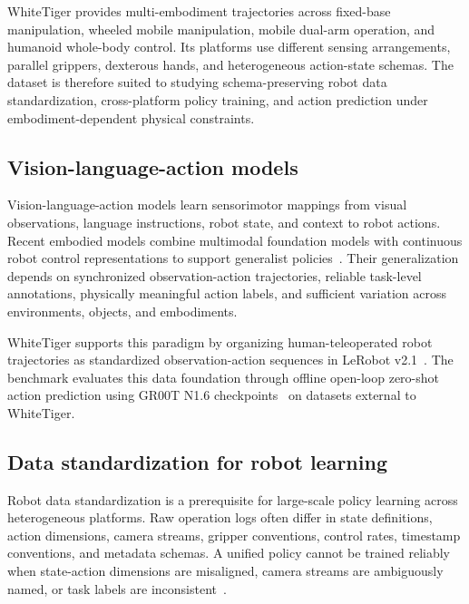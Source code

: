 WhiteTiger provides multi-embodiment trajectories across fixed-base manipulation, wheeled mobile manipulation, mobile dual-arm operation, and humanoid whole-body control. Its platforms use different sensing arrangements, parallel grippers, dexterous hands, and heterogeneous action-state schemas. The dataset is therefore suited to studying schema-preserving robot data standardization, cross-platform policy training, and action prediction under embodiment-dependent physical constraints.

\subsection{Vision-language-action models}

Vision-language-action models learn sensorimotor mappings from visual observations, language instructions, robot state, and context to robot actions. Recent embodied models combine multimodal foundation models with continuous robot control representations to support generalist policies~\cite{driess2023palme,brohan2023rt2,ghosh2024octo,kim2024openvla,black2024pi0,nvidia2025grootn1}. Their generalization depends on synchronized observation-action trajectories, reliable task-level annotations, physically meaningful action labels, and sufficient variation across environments, objects, and embodiments.

WhiteTiger supports this paradigm by organizing human-teleoperated robot trajectories as standardized observation-action sequences in LeRobot v2.1~\cite{cadene2026lerobot}. The benchmark evaluates this data foundation through offline open-loop zero-shot action prediction using GR00T N1.6 checkpoints~\cite{nvidia2025grootn1} on datasets external to WhiteTiger.

\subsection{Data standardization for robot learning}

Robot data standardization is a prerequisite for large-scale policy learning across heterogeneous platforms. Raw operation logs often differ in state definitions, action dimensions, camera streams, gripper conventions, control rates, timestamp conventions, and metadata schemas. A unified policy cannot be trained reliably when state-action dimensions are misaligned, camera streams are ambiguously named, or task labels are inconsistent~\cite{dasari2020robonet,oneill2023openx,ghosh2024octo}.

